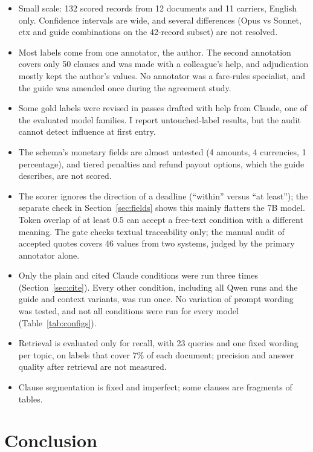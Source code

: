 \documentclass[11pt,a4paper]{article}
\begin{document}
\begin{itemize}
  \item Small scale: 132 scored records from 12 documents and 11 carriers, English only. Confidence intervals are wide, and several differences (Opus vs Sonnet, ctx and guide combinations on the 42-record subset) are not resolved.
  \item Most labels come from one annotator, the author. The second annotation covers only 50 clauses and was made with a colleague's help, and adjudication mostly kept the author's values. No annotator was a fare-rules specialist, and the guide was amended once during the agreement study.
  \item Some gold labels were revised in passes drafted with help from Claude, one of the evaluated model families. I report untouched-label results, but the audit cannot detect influence at first entry.
  \item The schema's monetary fields are almost untested (4 amounts, 4 currencies, 1 percentage), and tiered penalties and refund payout options, which the guide describes, are not scored.
  \item The scorer ignores the direction of a deadline (``within'' versus ``at least''); the separate check in Section~\ref{sec:fields} shows this mainly flatters the 7B model. Token overlap of at least 0.5 can accept a free-text condition with a different meaning. The gate checks textual traceability only; the manual audit of accepted quotes covers 46 values from two systems, judged by the primary annotator alone.
  \item Only the plain and cited Claude conditions were run three times (Section~\ref{sec:cite}). Every other condition, including all Qwen runs and the guide and context variants, was run once. No variation of prompt wording was tested, and not all conditions were run for every model (Table~\ref{tab:configs}).
  \item Retrieval is evaluated only for recall, with 23 queries and one fixed wording per topic, on labels that cover 7\% of each document; precision and answer quality after retrieval are not measured.
  \item Clause segmentation is fixed and imperfect; some clauses are fragments of tables.
\end{itemize}

\section{Conclusion}
\end{document}
